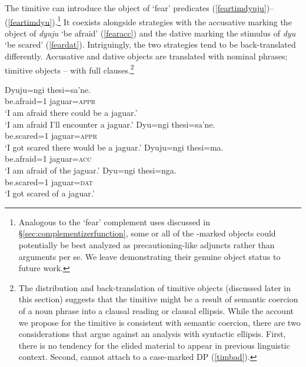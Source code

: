 \documentclass[output=paper,colorlinks,citecolor=brown]{langscibook}
\begin{document}
{The timitive  can introduce the object of `fear' predicates (\ref{feartimdyuju})--(\ref{feartimdyu}).\footnote{Analogous to the `fear' complement uses discussed in \S\ref{sec:complementizerfunction}, some or all of the \sane{}-marked objects could potentially be best analyzed as precautioning-like adjuncts rather than arguments per se. We leave demonstrating their genuine object status to future work.} It coexists alongside strategies with the accusative  marking the object of \textit{dyuju} `be afraid' (\ref{fearacc}) and the dative  marking the stimulus of \textit{dyu} `be scared' (\ref{feardat}). Intriguingly, the two strategies tend to be back-translated differently. Accusative and dative objects are translated with nominal phrases; timitive objects -- with full clauses.}\footnote{The distribution and back-translation of timitive objects (discussed later in this section) suggests that the  timitive might be a result of semantic coercion of a noun phrase into a clausal reading or clausal ellipsis. While the account we propose for the timitive is consistent with semantic coercion, there are two considerations that argue against an analysis with syntactic ellipsis. First, there is no tendency for the elided material to appear in previous linguistic context. Second, \sane[] cannot attach to a case-marked DP (\ref{timbad}).


\z
}
    \begin{exe} \ex \label{feartimdyuju}
      \gll Dyuju=ngi        {\ob}thesi=sa'ne.{\cb} \\
         {be.afraid=\textsc{1}} jaguar=\textsc{appr} \\
    \glt `I am afraid there could be a jaguar.' \\
        `I am afraid I'll encounter a jaguar.'
    \ex \label{feartimdyu}
        \gll Dyu=ngi {\ob}thesi=sa'ne.{\cb} \\
         {be.scared=\textsc{1}} jaguar=\textsc{appr} \\
    \glt `I got scared there would be a jaguar.'
    \ex \label{fearacc}
    \gll Dyuju=ngi thesi=ma. \\
        {be.afraid=\textsc{1}} jaguar=\textsc{acc} \\
    \glt `I am afraid of the jaguar.'
    \ex \label{feardat}
    \gll Dyu=ngi thesi=nga. \\
         {be.scared=\textsc{1}} jaguar=\textsc{dat} \\
    \glt `I got scared of a jaguar.'
\end{exe}
\end{document}
